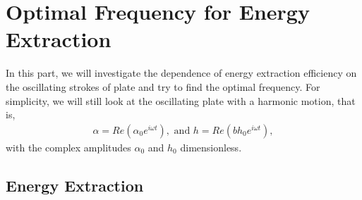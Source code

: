 \section{Optimal Frequency for Energy Extraction}

In this part, we will investigate the dependence of energy extraction efficiency on the oscillating strokes of plate and try to find the optimal frequency.
For simplicity, we will still look at the oscillating plate with a harmonic motion, that is,
\begin{align}
\alpha = Re(\alpha_0 e^{i\omega t}),    \text{    and   }        h = Re(b h_0 e^{i\omega t}),
\end{align}
with the complex amplitudes $\alpha_0$ and $h_0$ dimensionless.

\subsection{Energy Extraction}

